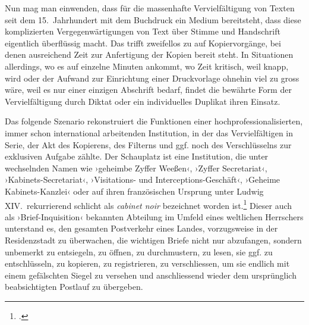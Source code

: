 \documentclass[a4paper,10pt]{article}
\newcommand{\inanf}[1]{›#1‹}
\begin{document}
Nun mag man einwenden, dass für die massenhafte Vervielfältigung von Texten seit dem 15.~Jahrhundert mit dem Buchdruck ein Medium bereitsteht, dass diese komplizierten Vergegenwärtigungen von Text über Stimme und Handschrift eigentlich überflüssig macht. Das trifft zweifellos zu auf Kopiervorgänge, bei denen ausreichend Zeit zur Anfertigung der Kopien bereit steht. In Situationen allerdings, wo es auf einzelne Minuten ankommt, wo Zeit kritisch, weil knapp, wird oder der Aufwand zur Einrichtung einer Druckvorlage ohnehin viel zu gross wäre, weil es nur einer einzigen Abschrift bedarf, findet die bewährte Form der Vervielfältigung durch Diktat oder ein individuelles Duplikat ihren Einsatz.

Das folgende Szenario rekonstruiert die Funktionen einer hochprofessionalisierten, immer schon international arbeitenden Institution, in der das Vervielfältigen in Serie, der Akt des Kopierens, des Filterns und ggf. noch des Verschlüsselns zur exklusiven Aufgabe zählte. Der Schauplatz ist eine Institution, die unter wechselnden Namen wie \inanf{geheimbe Zyffer Weeßen}, \inanf{Zyffer Secretariat}, \inanf{Kabinets-Secretariat}, \inanf{Visitations- und Interceptions-Geschäft}, \inanf{Geheime Kabinets-Kanzlei} oder auf ihren französischen Ursprung unter Ludwig XIV.\ rekurrierend schlicht als \emph{cabinet noir} bezeichnet worden ist.\footcite[134]{leeuw:1999} Dieser auch als \inanf{Brief-Inquisition} bekannten Abteilung im Umfeld eines weltlichen Herrschers unterstand es, den gesamten Postverkehr eines Landes, vorzugsweise in der Residenzstadt zu überwachen, die wichtigen Briefe nicht nur abzufangen, sondern unbemerkt zu entsiegeln, zu öffnen, zu durchmustern, zu lesen, sie ggf. zu entschlüsseln, zu kopieren, zu registrieren, zu verschliessen, um sie endlich mit einem gefälschten Siegel zu versehen und anschliessend wieder dem ursprünglich beabsichtigten Postlauf zu übergeben.
\end{document}

